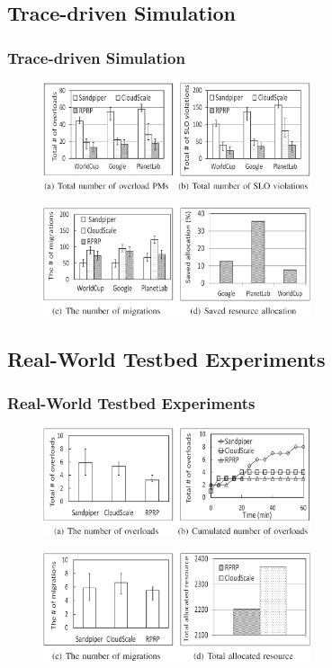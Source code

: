 \documentclass{beamer}
\begin{document}
\subsection{Trace-driven Simulation}
	\begin{frame}
	\frametitle{Trace-driven Simulation}
		\begin{figure}[h!]
		\centering
		\includegraphics[width=0.7\textwidth]{./figure/eva2_1.PNG}
		\end{figure}
		\begin{figure}[h!]
		\centering
		\includegraphics[width=0.7\textwidth]{./figure/eva2_2.PNG}
		\end{figure}
	\end{frame}

\subsection{Real-World Testbed Experiments}
	\begin{frame}
	\frametitle{Real-World Testbed Experiments}
		\begin{figure}[h!]
		\centering
		\includegraphics[width=0.7\textwidth]{./figure/eva3_1.PNG}
		\end{figure}
		\begin{figure}[h!]
		\centering
		\includegraphics[width=0.7\textwidth]{./figure/eva3_2.PNG}
		\end{figure}
	\end{frame}
\end{document}
